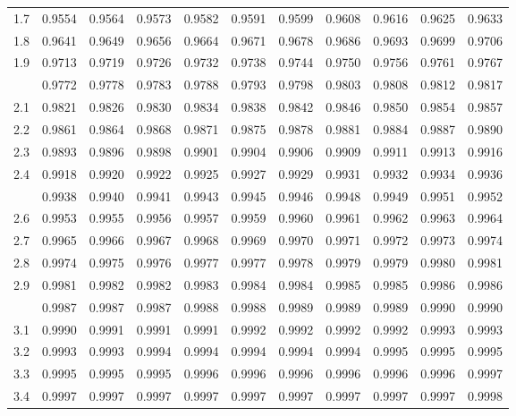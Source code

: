 \documentclass[
]{article}
\begin{document}
\begin{table}[H]
\begin{tabular}{lrrrrrrrrrr}
1.7 & 0.9554 & 0.9564 & 0.9573 & 0.9582 & 0.9591 & 0.9599 & 0.9608 & 0.9616 & 0.9625 & 0.9633\\
1.8 & 0.9641 & 0.9649 & 0.9656 & 0.9664 & 0.9671 & 0.9678 & 0.9686 & 0.9693 & 0.9699 & 0.9706\\
1.9 & 0.9713 & 0.9719 & 0.9726 & 0.9732 & 0.9738 & 0.9744 & 0.9750 & 0.9756 & 0.9761 & 0.9767\\
\addlinespace
2.0 & 0.9772 & 0.9778 & 0.9783 & 0.9788 & 0.9793 & 0.9798 & 0.9803 & 0.9808 & 0.9812 & 0.9817\\
2.1 & 0.9821 & 0.9826 & 0.9830 & 0.9834 & 0.9838 & 0.9842 & 0.9846 & 0.9850 & 0.9854 & 0.9857\\
2.2 & 0.9861 & 0.9864 & 0.9868 & 0.9871 & 0.9875 & 0.9878 & 0.9881 & 0.9884 & 0.9887 & 0.9890\\
2.3 & 0.9893 & 0.9896 & 0.9898 & 0.9901 & 0.9904 & 0.9906 & 0.9909 & 0.9911 & 0.9913 & 0.9916\\
2.4 & 0.9918 & 0.9920 & 0.9922 & 0.9925 & 0.9927 & 0.9929 & 0.9931 & 0.9932 & 0.9934 & 0.9936\\
\addlinespace
2.5 & 0.9938 & 0.9940 & 0.9941 & 0.9943 & 0.9945 & 0.9946 & 0.9948 & 0.9949 & 0.9951 & 0.9952\\
2.6 & 0.9953 & 0.9955 & 0.9956 & 0.9957 & 0.9959 & 0.9960 & 0.9961 & 0.9962 & 0.9963 & 0.9964\\
2.7 & 0.9965 & 0.9966 & 0.9967 & 0.9968 & 0.9969 & 0.9970 & 0.9971 & 0.9972 & 0.9973 & 0.9974\\
2.8 & 0.9974 & 0.9975 & 0.9976 & 0.9977 & 0.9977 & 0.9978 & 0.9979 & 0.9979 & 0.9980 & 0.9981\\
2.9 & 0.9981 & 0.9982 & 0.9982 & 0.9983 & 0.9984 & 0.9984 & 0.9985 & 0.9985 & 0.9986 & 0.9986\\
\addlinespace
3.0 & 0.9987 & 0.9987 & 0.9987 & 0.9988 & 0.9988 & 0.9989 & 0.9989 & 0.9989 & 0.9990 & 0.9990\\
3.1 & 0.9990 & 0.9991 & 0.9991 & 0.9991 & 0.9992 & 0.9992 & 0.9992 & 0.9992 & 0.9993 & 0.9993\\
3.2 & 0.9993 & 0.9993 & 0.9994 & 0.9994 & 0.9994 & 0.9994 & 0.9994 & 0.9995 & 0.9995 & 0.9995\\
3.3 & 0.9995 & 0.9995 & 0.9995 & 0.9996 & 0.9996 & 0.9996 & 0.9996 & 0.9996 & 0.9996 & 0.9997\\
3.4 & 0.9997 & 0.9997 & 0.9997 & 0.9997 & 0.9997 & 0.9997 & 0.9997 & 0.9997 & 0.9997 & 0.9998\\
\bottomrule
\end{tabular}
\end{table}
\end{document}

